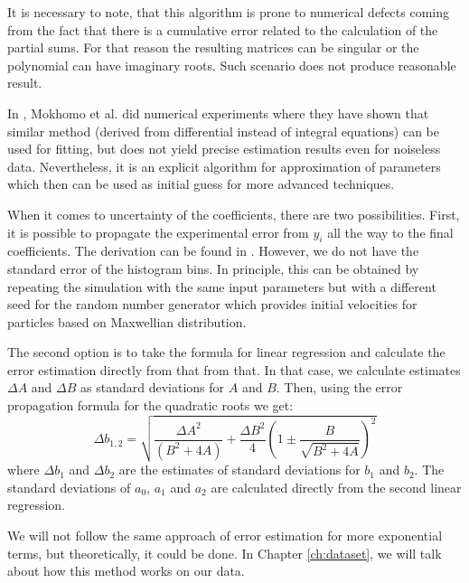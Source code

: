 It is necessary to note, that this algorithm is prone to numerical defects coming from the fact that there is a cumulative error related to the calculation of the partial sums. For that reason the resulting matrices can be singular or the polynomial can have imaginary roots. Such scenario does not produce reasonable result.

In \cite{mokhomo2021}, Mokhomo et al. did numerical experiments where they have shown that similar method (derived from differential instead of integral equations) can be used for fitting, but does not yield precise estimation results even for noiseless data. Nevertheless, it is an explicit algorithm for approximation of parameters which then can be used as initial guess for more advanced techniques.

When it comes to uncertainty of the coefficients, there are two possibilities. First, it is possible to propagate the experimental error from $y_i$ all the way to the final coefficients. The derivation can be found in \cite{lecca2021}. However, we do not have the standard error of the histogram bins. In principle, this can be obtained by repeating the simulation with the same input parameters but with a different seed for the random number generator which provides initial velocities for particles based on Maxwellian distribution. 

The second option is to take the formula for linear regression and calculate the error estimation directly from that from that. In that case, we calculate estimates $\Delta A$ and $\Delta B$ as standard deviations for $A$ and $B$. Then, using the error propagation formula for the quadratic roots we get:
\begin{equation}
	\label{eq:b-coef-error1}
	\Delta b_{1,2} = \sqrt{\frac{\Delta A^2}{(B^2 + 4A)} + \frac{\Delta B^2}{4} \left(1 \pm \frac{B}{\sqrt{B^2 + 4A}}\right)^2}
\end{equation}
where $\Delta b_1$ and $\Delta b_2$ are the estimates of standard deviations for $b_1$ and $b_2$.
The standard deviations of $a_0$, $a_1$ and $a_2$ are calculated directly from the second linear regression.

We will not follow the same approach of error estimation for more exponential terms, but theoretically, it could be done. In Chapter \ref{ch:dataset}, we will talk about how this method works on our data.

